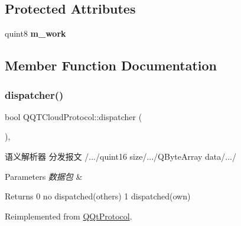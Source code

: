 \subsection*{Protected Attributes}
\begin{DoxyCompactItemize}
\item 
\mbox{\label{class_q_q_t_cloud_protocol_a123799e982505274c12901ac8d0904c9}} 
quint8 {\bfseries m\+\_\+work}
\end{DoxyCompactItemize}


\subsection{Member Function Documentation}
\mbox{\label{class_q_q_t_cloud_protocol_ae76f5efc67e9ac54a98e934266ecca0a}} 
\subsubsection{\texorpdfstring{dispatcher()}{dispatcher()}}
{\footnotesize\ttfamily bool Q\+Q\+T\+Cloud\+Protocol\+::dispatcher (\begin{DoxyParamCaption}\item[{const Q\+Byte\+Array \&}]{ }\end{DoxyParamCaption})\hspace{0.3cm}{\ttfamily [override]}, {\ttfamily [virtual]}}



语义解析器 分发报文 /.../quint16 size/.../\+Q\+Byte\+Array data/.../ 


\begin{DoxyParams}{Parameters}
{\em 数据包} & \\
\hline
\end{DoxyParams}
\begin{DoxyReturn}{Returns}
0 no dispatched(others) 1 dispatched(own) 
\end{DoxyReturn}


Reimplemented from \mbox{\hyperlink{class_q_qt_protocol_a35a69c4b89c8cf7459038f40d75e0dc9}{Q\+Qt\+Protocol}}.

\mbox{\label{class_q_q_t_cloud_protocol_a3d0c9c59e983a8e8f315c3ad174154fa}} 
